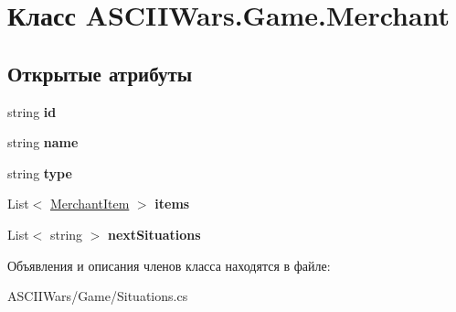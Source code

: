 \hypertarget{class_a_s_c_i_i_wars_1_1_game_1_1_merchant}{}\section{Класс A\+S\+C\+I\+I\+Wars.\+Game.\+Merchant}
\label{class_a_s_c_i_i_wars_1_1_game_1_1_merchant}
\subsection*{Открытые атрибуты}
\begin{DoxyCompactItemize}
\item 
\hypertarget{class_a_s_c_i_i_wars_1_1_game_1_1_merchant_a6cc3b433c5be3021a26bdab57d9534e8}{}\label{class_a_s_c_i_i_wars_1_1_game_1_1_merchant_a6cc3b433c5be3021a26bdab57d9534e8} 
string {\bfseries id}
\item 
\hypertarget{class_a_s_c_i_i_wars_1_1_game_1_1_merchant_ada225b0cd9c12c73b70729b821541d90}{}\label{class_a_s_c_i_i_wars_1_1_game_1_1_merchant_ada225b0cd9c12c73b70729b821541d90} 
string {\bfseries name}
\item 
\hypertarget{class_a_s_c_i_i_wars_1_1_game_1_1_merchant_a49fe8caa978e4dd0199f0b583f1c99a3}{}\label{class_a_s_c_i_i_wars_1_1_game_1_1_merchant_a49fe8caa978e4dd0199f0b583f1c99a3} 
string {\bfseries type}
\item 
\hypertarget{class_a_s_c_i_i_wars_1_1_game_1_1_merchant_aa35fa4b7dabae111e0819b68866fceba}{}\label{class_a_s_c_i_i_wars_1_1_game_1_1_merchant_aa35fa4b7dabae111e0819b68866fceba} 
List$<$ \hyperlink{class_a_s_c_i_i_wars_1_1_game_1_1_merchant_item}{Merchant\+Item} $>$ {\bfseries items}
\item 
\hypertarget{class_a_s_c_i_i_wars_1_1_game_1_1_merchant_a882142ada4b87c08a3a6b9e1c895c7c0}{}\label{class_a_s_c_i_i_wars_1_1_game_1_1_merchant_a882142ada4b87c08a3a6b9e1c895c7c0} 
List$<$ string $>$ {\bfseries next\+Situations}
\end{DoxyCompactItemize}


Объявления и описания членов класса находятся в файле\+:\begin{DoxyCompactItemize}
\item 
A\+S\+C\+I\+I\+Wars/\+Game/Situations.\+cs\end{DoxyCompactItemize}
